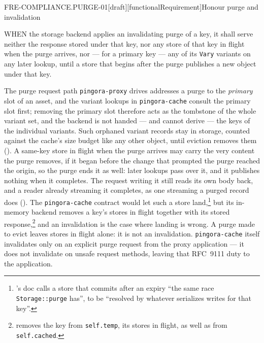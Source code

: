 \begin{requirement}{FRE-COMPLIANCE.PURGE-01}[draft][functionalRequirement]{Honour purge and invalidation}


  WHEN the storage backend applies an invalidating purge of a key, it shall
  serve neither the response stored under that key, nor any store of that
  key in flight when the purge arrives, nor --- for a primary key --- any of
  its \texttt{Vary} variants on any later lookup, until a store that begins
  after the purge publishes a new object under that key.

  The purge request path \texttt{pingora-proxy} drives addresses a purge to
  the \emph{primary} slot of an asset, and the variant lookups in
  \texttt{pingora-cache} consult the primary slot first; removing the primary slot therefore
  acts as the tombstone of the whole variant set, and the backend is not
  handed --- and cannot derive --- the keys of the individual variants. Such
  orphaned variant records stay in storage, counted against the cache's size
  budget like any other object, until eviction removes them
  (). A same-key store in flight
  when the purge arrives may carry the very content the purge removes, if it
  began before the change that prompted the purge reached the origin, so the
  purge ends it as well: later lookups pass over it, and it publishes nothing
  when it completes. The request writing it still reads its own body back,
  and a reader already streaming it completes, as one streaming a purged
  record does ().
  The \texttt{pingora-cache} contract would let such a store
  land,\footnote{'s
  doc calls a store that commits after an expiry ``the same race
  \texttt{Storage::purge} has'', to be ``resolved by whatever serializes
  writes for that key''.} but its in-memory backend removes a key's stores in
  flight together with its stored
  response,\footnote{
  removes the key from \texttt{self.temp}, its stores in flight, as well as
  from \texttt{self.cached}.} and an invalidation is the case where landing
  is wrong. A purge made to evict leaves stores in flight alone: it is not an
  invalidation. \texttt{pingora-cache} itself invalidates only on an
  explicit purge request from the proxy application --- it does not
  invalidate on unsafe request methods, leaving that RFC~9111 duty to the
  application.


\end{requirement}

